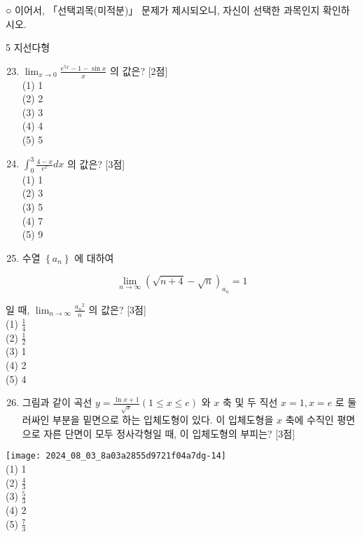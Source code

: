 \documentclass[10pt]{article}
\begin{document}
○ 이어서, 「선택괴목(미적분)」 문제가 제시되오니, 자신이 선택한 과목인지 확인하시오.

5 지선다형

\begin{enumerate}
  \setcounter{enumi}{22}
  \item \(\lim _{x \rightarrow 0} \frac{e^{5 x}-1-\sin x}{x}\) 의 값은? [2점]\\
(1) 1\\
(2) 2\\
(3) 3\\
(4) 4\\
(5) 5

  \item \(\int_{0}^{3} \frac{4-x}{e^{x}} d x\) 의 값은? [3점]\\
(1) 1\\
(2) 3\\
(3) 5\\
(4) 7\\
(5) 9

  \item 수열 \(\left\{a_{n}\right\}\) 에 대하여

\end{enumerate}

\[
\lim _{n \rightarrow \infty}(\sqrt{n+4}-\sqrt{n})_{a_{n}}=1
\]

일 때, \(\lim _{n \rightarrow \infty} \frac{a_{n}{ }^{2}}{n}\) 의 값은? [3점]\\
(1) \(\frac{1}{4}\)\\
(2) \(\frac{1}{2}\)\\
(3) 1\\
(4) 2\\
(5) 4

\begin{enumerate}
  \setcounter{enumi}{25}
  \item 그림과 같이 곡선 \(y=\frac{\ln x+1}{\sqrt{x}}(1 \leq x \leq e)\) 와 \(x\) 축 및 두 직선 \(x=1, x=e\) 로 둘러싸인 부분을 밑면으로 하는 입체도형이 있다. 이 입체도형을 \(x\) 축에 수직인 평면으로 자른 단면이 모두 정사각형일 때, 이 입체도형의 부피는? [3점]
\end{enumerate}

\texttt{[image: 2024\_08\_03\_8a03a2855d9721f04a7dg-14]}\\
(1) 1\\
(2) \(\frac{4}{3}\)\\
(3) \(\frac{5}{3}\)\\
(4) 2\\
(5) \(\frac{7}{3}\)
\end{document}
